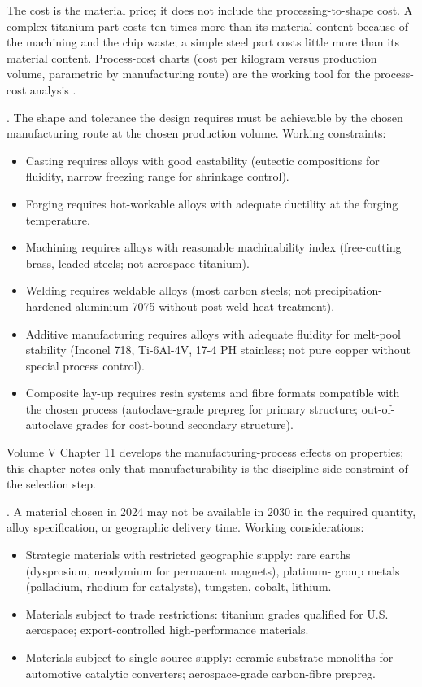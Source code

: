 The cost is the material price; it does not include the
processing-to-shape cost. A complex titanium part costs ten times more
than its material content because of the machining and the chip waste;
a simple steel part costs little more than its material content.
Process-cost charts (cost per kilogram versus production volume,
parametric by manufacturing route) are the working tool for the
process-cost analysis \cite[ch.~14]{text:ashby2017}.

. The shape and tolerance the design
requires must be achievable by the chosen manufacturing route at the
chosen production volume. Working constraints:

\begin{itemize}[leftmargin=*]
\item Casting requires alloys with good castability (eutectic
  compositions for fluidity, narrow freezing range for shrinkage
  control).
\item Forging requires hot-workable alloys with adequate ductility at
  the forging temperature.
\item Machining requires alloys with reasonable machinability index
  (free-cutting brass, leaded steels; not aerospace titanium).
\item Welding requires weldable alloys (most carbon steels; not
  precipitation-hardened aluminium 7075 without post-weld heat
  treatment).
\item Additive manufacturing requires alloys with adequate fluidity
  for melt-pool stability (Inconel 718, Ti-6Al-4V, 17-4 PH stainless;
  not pure copper without special process control).
\item Composite lay-up requires resin systems and fibre formats
  compatible with the chosen process (autoclave-grade prepreg for
  primary structure; out-of-autoclave grades for cost-bound
  secondary structure).
\end{itemize}

Volume V Chapter 11 develops the manufacturing-process effects on
properties; this chapter notes only that manufacturability is the
discipline-side constraint of the selection step.

. A material chosen in 2024 may not be available
in 2030 in the required quantity, alloy specification, or geographic
delivery time. Working considerations:

\begin{itemize}[leftmargin=*]
\item Strategic materials with restricted geographic supply: rare
  earths (dysprosium, neodymium for permanent magnets), platinum-
  group metals (palladium, rhodium for catalysts), tungsten, cobalt,
  lithium.
\item Materials subject to trade restrictions: titanium grades
  qualified for U.S. aerospace; export-controlled high-performance
  materials.
\item Materials subject to single-source supply: ceramic substrate
  monoliths for automotive catalytic converters; aerospace-grade
  carbon-fibre prepreg.
\end{itemize}

